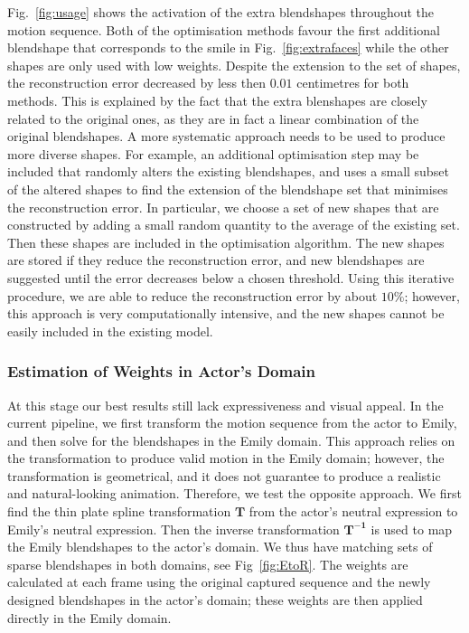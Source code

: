 Fig.~\ref{fig:usage} shows the activation of the extra blendshapes throughout the motion sequence. Both of the optimisation methods favour the first additional blendshape that corresponds to the smile in Fig.~\ref{fig:extrafaces} while the other shapes are only used with low weights. Despite the extension to the set of shapes, the reconstruction error decreased by less then $0.01$ centimetres for both methods. This is explained by the fact that the extra blenshapes are closely related to the original ones, as they are in fact a linear combination of the original blendshapes. A more systematic approach needs to be used to produce more diverse shapes. For example, an additional optimisation step may be included that randomly alters the existing blendshapes, and uses a small subset of the altered shapes to find the extension of the blendshape set that minimises the reconstruction error. In particular, we choose a set of new shapes that are constructed by adding a small random quantity to the average of the existing set. Then these shapes are included in the optimisation algorithm. The new shapes are stored if they reduce the reconstruction error, and new blendshapes are suggested until the error decreases below a chosen threshold. Using this iterative procedure, we are able to reduce the reconstruction error by about $10 \%$; however, this approach is very computationally intensive, and the new shapes cannot be easily included in the existing model. 

\subsubsection{Estimation of Weights in Actor's Domain}
\label{sec:estimation_w_actor_domain}

At this stage our best results still lack expressiveness and visual appeal. In the current pipeline, we first transform the motion sequence from the actor to Emily, and then solve for the blendshapes in the Emily domain. This approach relies on the transformation to produce valid motion in the Emily domain; however, the transformation is geometrical, and it does not guarantee to produce a realistic and natural-looking animation. Therefore, we test the opposite approach. We first find the thin plate spline transformation $\mathbf{T}$ from the actor's neutral expression to Emily's neutral expression. Then the inverse transformation $\mathbf{T^{-1}}$ is used to map the Emily blendshapes to the actor's domain. We thus have matching sets of sparse blendshapes in both domains, see Fig~\ref{fig:EtoR}. The weights are calculated at each frame using the original captured sequence and the newly designed blendshapes in the actor's domain; these weights are then applied directly in the Emily domain. 

